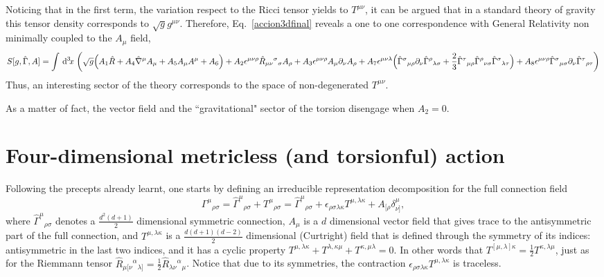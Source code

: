 \documentclass[twocolumn,
  showpacs,showkeys,prd,superscriptaddress]{revtex4-1}
\newcommand{\hl}[1]{{\color{red} \textbf{#1}}}
\begin{document}
Noticing that in  the first term, the variation respect to the Ricci tensor yields to $T^{\mu\nu}$, it can be argued that in a standard theory of gravity this tensor density corresponds to $\sqrt{g}g^{\mu\nu}$.
Therefore, Eq.~\eqref{accion3dfinal} reveals a one to one correspondence with General Relativity non minimally coupled to the $A_\mu$ field, %
\begin{dmath}
  \label{accion3dGR}
  S[g,\hat{\Gamma},A] = \int \dn{3}{x} \bigg(
  \sqrt{g} \Big(  A_1 \hat{R} + A_4\hat{\nabla}^\mu A_\mu + A_5 A_\mu A^\mu + A_6  \Big)
  + A_2\epsilon^{\mu\nu\rho} \hat{R}_{\mu\nu}{}^{\sigma}{}_\sigma A_\rho
  + A_3\epsilon^{\mu\nu\rho}A_\mu\partial_\nu A_\rho
  + A_7\epsilon^{\mu\nu\lambda}\Big(\hat{\Gamma}^{\sigma}{}_{\mu\rho}\partial_\nu\hat{\Gamma}^{\rho}{}_{\lambda\sigma}
  + \frac{2}{3}\hat{\Gamma}^{\tau}{}_{\mu\rho}\hat{\Gamma}^{\rho}{}_{\nu\sigma}{}\hat{\Gamma}^{\sigma}{}_{\lambda\tau}{}\Big)
  + A_8\epsilon^{\mu\nu\rho}\hat{\Gamma}^{\sigma}{}_{\mu\sigma}\partial_\nu\hat{\Gamma}^{\tau}{}_{\rho\tau}
  \bigg)
\end{dmath}
Thus, an interesting sector of the theory corresponds to the space of non-degenerated $T^{\mu\nu}$. 

As a matter of fact, the vector field and the ``gravitational" sector of the torsion disengage when $A_2=0$.


\section{Four-dimensional metricless (and torsionful) action}

Following the precepts  already learnt, one starts  by defining an irreducible representation decomposition for the full connection field 
\begin{equation}
  \Gamma^\mu{}_{\rho\sigma} = \hat{\Gamma}^\mu{}_{\rho\sigma} + T^\mu{}_{\rho\sigma} = \hat{\Gamma}^\mu{}_{\rho\sigma} + \epsilon_{\rho\sigma\lambda\kappa}T^{\mu,\lambda\kappa}+A_{[\rho}\delta^\mu_{\nu]},
\end{equation}
where $\hat{\Gamma}^\mu{}_{\rho\sigma}$ denotes a $\tfrac{d^2(d+1)}{2}$ dimensional symmetric connection, $A_\mu$ is a $d$ dimensional vector field  that gives trace to the antisymmetric part of the full connection, and  $T^{\mu,\lambda\kappa}$ is a $\tfrac{d(d+1)(d-2)}{2}$ dimensional (Curtright) field that is defined through the symmetry of its indices: antisymmetric in the last two indices, and it has a cyclic property $T^{\mu,\lambda\kappa}+T^{\lambda,\kappa\mu}+T^{\kappa,\mu\lambda}=0$. In other words that $T^{[\mu,\lambda]\kappa}=\frac{1}{2}T^{\kappa,\lambda\mu}$, just as for  the Riemmann tensor $\hat{R}_{\mu[\nu}{}^\alpha{}_{\lambda]}=\frac{1}{2}\hat{R}_{\lambda\nu}{}^\alpha{}_{\mu}$. Notice that due to its symmetries, the contraction $\epsilon_{\rho\sigma\lambda\kappa}T^{\mu,\lambda\kappa}$ is traceless.
\end{document}

